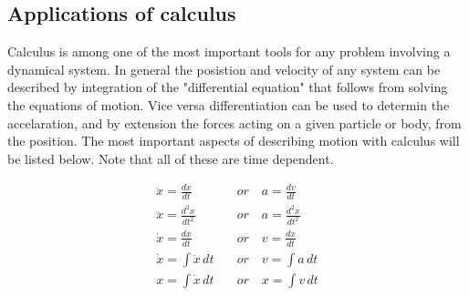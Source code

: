 \documentclass[11pt, a4paper]{article}
\begin{document}
\subsection{Applications of calculus}
Calculus is among one of the most important tools for any problem involving a dynamical system.
In general the posistion and velocity of any system can be described by integration of the "differential equation"
that follows from solving the equations of motion. Vice versa differentiation can be used to determin
the accelaration, and by extension the forces acting on a given particle or body, from the position. The most
important aspects of describing motion with calculus will be listed below. Note that all of these are time dependent.

\begin{align*}
\ddot{x} = \frac{d\dot{x}}{dt} \quad &or \quad a = \frac{dv}{dt}  \\
\ddot{x} = \frac{d^2x}{dt^2} \quad &or \quad a = \frac{d^2x}{dt^2} \\
\dot{x} = \frac{dx}{dt} \quad &or \quad v = \frac{dx}{dt}  \\
\dot{x} = \int \ddot{x} \,dt \quad &or \quad v = \int a \,dt\\
x = \int \dot{x} \,dt \quad &or \quad x = \int v \,dt
\end{align*}
\end{document}
